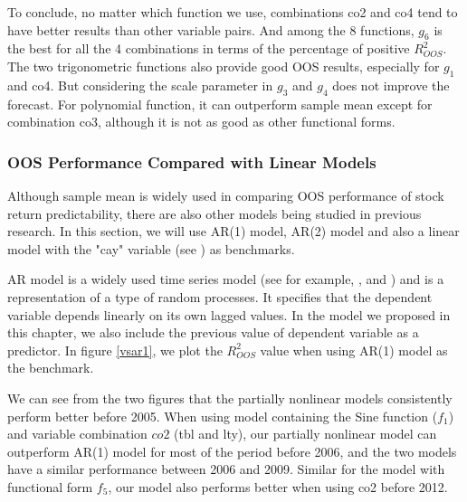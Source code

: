 \documentclass[a4paper,12pt,times,numbered,print,index]{report}
\numberwithin{equation}{section}
\begin{document}
To conclude, no matter which function we use, combinations co2 and co4 tend to have better results than other variable pairs. And among the 8 functions, $g_6$ is the best for all the 4 combinations in terms of the percentage of positive $R^2_{OOS}$. The two trigonometric functions also provide good OOS results, especially for $g_1$ and co4. But considering the scale parameter in $g_3$ and $g_4$ does not improve the forecast. For polynomial function, it can outperform sample mean except for combination co3, although it is not as good as other functional forms.

\subsubsection{OOS Performance Compared with Linear Models}
Although sample mean is widely used in comparing OOS performance of stock return predictability, there are also other models being studied in previous research. In this section, we will use AR(1) model, AR(2) model and also a linear model with the "cay" variable (see \cite{lettau2001consumption}) as benchmarks. 

AR model is a widely used time series model (see for example, \cite{box2015time}, \cite{mobarek2000weak} and \cite{areal2002realized}) and is a representation of a type of random processes. It specifies that the dependent variable depends linearly on its own lagged values. In the model we proposed in this chapter, we also include the previous value of dependent variable as a predictor. In figure \ref{vsar1}, we plot the $R^2_{OOS}$ value when using AR(1) model as the benchmark.

We can see from the two figures that the partially nonlinear models consistently perform better before 2005. When using model containing the Sine function ($f_1$) and variable combination $co2$ (tbl and lty), our partially nonlinear model can outperform AR(1) model for most of the period before 2006, and the two models have a similar performance between 2006 and 2009. Similar for the model with functional form $f_5$, our model also performs better when using co2 before 2012. 
\end{document}
